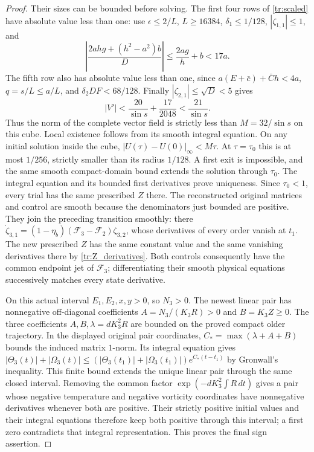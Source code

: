 \begin{proof}
Their sizes can be bounded before solving. The first four rows of
\eqref{tr:scaled} have absolute value less than one: use
$\epsilon\leq2/L$, $L\geq16384$, $\delta_1\leq1/128$,
$|\zeta_{1,1}|\leq1$, and
\[
 \left|\frac{2ahg+(h^2-a^2)b}{D}\right|
 \leq\frac{2ag}{h}+b<17a.
\]
The fifth row also has absolute value less than one, since
$a(E+\bar c)+\bar Ch<4a$, $q=s/L\leq a/L$,
and $\delta_2DF<68/128$.
Finally $|\zeta_{2,1}|\leq\sqrt D<5$ gives
\[
 |V'|<\frac{20}{\sin s}+\frac{17}{2048}
       <\frac{21}{\sin s}.
\]
Thus the norm of the complete vector field is strictly less than
$M=32/\sin s$ on this cube. Local existence follows from its
smooth integral equation. On any initial solution inside the cube,
$|U(\tau)-U(0)|_\infty<M\tau$. At $\tau=\tau_0$
this is at most $1/256$, strictly smaller than its radius $1/128$.
A first exit is impossible, and the same smooth compact-domain
bound extends the solution through $\tau_0$. The integral
equation and its bounded first derivatives prove uniqueness.
Since $\tau_0<1$, every trial has the same prescribed $Z$ there.
The reconstructed original matrices and control are smooth because
the denominators just bounded are positive.
They join the preceding transition smoothly: there
$\dot\zeta_{3,1}=(1-\eta_b)(\mathcal F_3-\mathcal F_2)\zeta_{3,2}$,
whose derivatives of every order vanish at $t_1$. The new prescribed
$Z$ has the same constant value and the same vanishing derivatives
there by \eqref{tr:Z_derivatives}. Both controls consequently have
the common endpoint jet of $\mathcal F_3$; differentiating their
smooth physical equations successively matches every state derivative.

On this actual interval $E_1,E_2,x,y>0$, so $N_3>0$.
The newest linear pair has nonnegative off-diagonal coefficients
$A=N_3/(K_3R)>0$ and $B=K_3Z\geq0$.
The three coefficients $A,B,\lambda=dK_3^2R$ are bounded on
the proved compact older trajectory. In the displayed original
pair coordinates, $C_*=\max(\lambda+A+B)$ bounds the induced
matrix $1$-norm. Its integral equation gives
$|\Theta_3(t)|+|\Omega_3(t)|\leq
(|\Theta_3(t_1)|+|\Omega_3(t_1)|)e^{C_*(t-t_1)}$
by Gronwall's inequality. This finite bound extends the unique
linear pair through the same closed interval.
Removing the common factor
$\exp(-dK_3^2\int R\,dt)$ gives a pair whose negative
temperature and negative vorticity coordinates have nonnegative
derivatives whenever both are positive. Their strictly positive
initial values and their integral equations therefore keep both
positive through this interval; a first zero contradicts that
integral representation. This proves the final sign assertion.
\end{proof}

